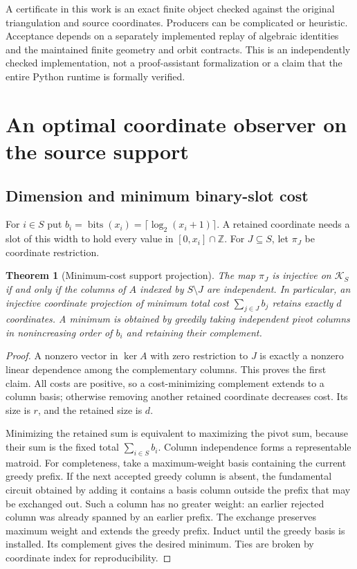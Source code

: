 \documentclass[11pt,a4paper]{article}
\newtheorem{theorem}{Theorem}[section]
\theoremstyle{definition}
\newcommand{\Z}{\mathbb Z}
\newcommand{\bits}{\operatorname{bits}}
\newcommand{\calK}{\mathcal K}
\begin{document}
A certificate in this work is an exact finite object checked against the
original triangulation and source coordinates.  Producers can be complicated
or heuristic.  Acceptance depends on a separately implemented replay of
algebraic identities and the maintained finite geometry and orbit contracts.
This is an independently checked implementation, not a proof-assistant
formalization or a claim that the entire Python runtime is formally verified.

\section{An optimal coordinate observer on the source support}
\label{sec:observer}

\subsection{Dimension and minimum binary-slot cost}

For $i\in S$ put $b_i=\bits(x_i)=\lceil\log_2(x_i+1)\rceil$.
A retained coordinate needs a slot of this width to hold every value in
$[0,x_i]\cap\Z$.  For $J\subseteq S$, let $\pi_J$ be coordinate restriction.

\begin{theorem}[Minimum-cost support projection]
\label{thm:optimal}
The map $\pi_J$ is injective on $\calK_S$ if and only if the columns of $A$
indexed by $S\setminus J$ are independent.  In particular, an injective
coordinate projection of minimum total cost $\sum_{j\in J}b_j$ retains exactly
$d$ coordinates.  A minimum is obtained by greedily taking independent pivot
columns in nonincreasing order of $b_i$ and retaining their complement.
\end{theorem}

\begin{proof}
A nonzero vector in $\ker A$ with zero restriction to $J$ is exactly a nonzero
linear dependence among the complementary columns.  This proves the first
claim.  All costs are positive, so a cost-minimizing complement extends to a
column basis; otherwise removing another retained coordinate decreases cost.
Its size is $r$, and the retained size is $d$.

Minimizing the retained sum is equivalent to maximizing the pivot sum, because
their sum is the fixed total $\sum_{i\in S}b_i$.  Column independence forms a
representable matroid.  For completeness, take a maximum-weight basis
containing the current greedy prefix.  If the next accepted greedy column is
absent, the fundamental circuit obtained by adding it contains a basis column
outside the prefix that may be exchanged out.  Such a column has no greater
weight: an earlier rejected column was already spanned by an earlier prefix.
The exchange preserves maximum weight and extends the greedy prefix.  Induct
until the greedy basis is installed.  Its complement gives the desired
minimum.  Ties are broken by coordinate index for reproducibility.
\end{proof}
\end{document}
